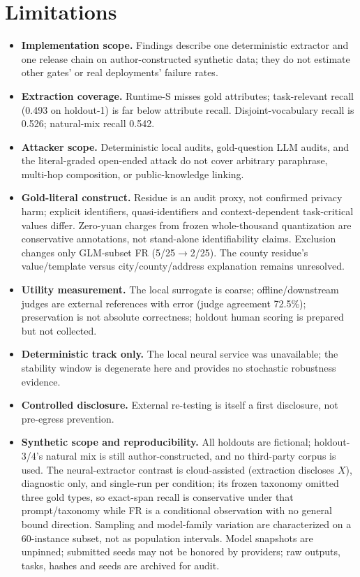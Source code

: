 \documentclass[11pt,a4paper]{article}
\begin{document}
\section{Limitations}\label{sec:limitations}
\begin{itemize}
\item \textbf{Implementation scope.} Findings describe one deterministic extractor and one release chain on author-constructed synthetic data; they do not estimate other gates' or real deployments' failure rates.
\item \textbf{Extraction coverage.} Runtime-S misses gold attributes; task-relevant recall (0.493 on holdout-1) is far below attribute recall. Disjoint-vocabulary recall is 0.526; natural-mix recall 0.542.
\item \textbf{Attacker scope.} Deterministic local audits, gold-question LLM audits, and the literal-graded open-ended attack do not cover arbitrary paraphrase, multi-hop composition, or public-knowledge linking.
\item \textbf{Gold-literal construct.} Residue is an audit proxy, not confirmed privacy harm; explicit identifiers, quasi-identifiers and context-dependent task-critical values differ. Zero-yuan charges from frozen whole-thousand quantization are conservative annotations, not stand-alone identifiability claims. Exclusion changes only GLM-subset FR (5/25$\to$2/25). The county residue's value/template versus city/county/address explanation remains unresolved.
\item \textbf{Utility measurement.} The local surrogate is coarse; offline/downstream judges are external references with error (judge agreement 72.5\%); preservation is not absolute correctness; holdout human scoring is prepared but not collected.
\item \textbf{Deterministic track only.} The local neural service was unavailable; the stability window is degenerate here and provides no stochastic robustness evidence.
\item \textbf{Controlled disclosure.} External re-testing is itself a first disclosure, not pre-egress prevention.
\item \textbf{Synthetic scope and reproducibility.} All holdouts are fictional; holdout-3/4's natural mix is still author-constructed, and no third-party corpus is used. The neural-extractor contrast is cloud-assisted (extraction discloses $X$), diagnostic only, and single-run per condition; its frozen taxonomy omitted three gold types, so exact-span recall is conservative under that prompt/taxonomy while FR is a conditional observation with no general bound direction. Sampling and model-family variation are characterized on a 60-instance subset, not as population intervals. Model snapshots are unpinned; submitted seeds may not be honored by providers; raw outputs, tasks, hashes and seeds are archived for audit.
\end{itemize}
\end{document}
